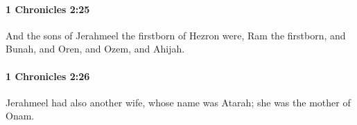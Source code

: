 		\paragraph{1 Chronicles 2:25} %
			\label{1CHRONICLES-2-25}

			And the sons of Jerahmeel the firstborn of Hezron were, Ram the firstborn, and Bunah, and Oren, and Ozem, and Ahijah.


		\paragraph{1 Chronicles 2:26} %
			\label{1CHRONICLES-2-26}

			Jerahmeel had also another wife, whose name was Atarah; she was the mother of Onam.


